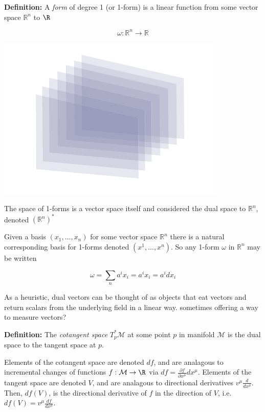 \documentclass{article}\usepackage[]{graphicx}\usepackage[]{color}
\newcommand{\Rn}{\mathbb{R}^n}
\newcommand{\M}{\mathcal{M}}
\begin{document}
\vspace{1cm}

\textbf{Definition:} A \textit{form} of degree 1 (or 1-form) is a linear function from some vector space $\Rn$ to $\R$

\vspace{-.18cm}

$$\omega:\mathbb{R}^n\rightarrow\mathbb{R}$$

\begin{center}
\includegraphics[scale=1]{1form.pdf}
\end{center}

The space of 1-forms is a vector space itself and considered the dual space to $\mathbb{R}^n$, denoted $(\mathbb{R}^n)^*$

Given a basis $(x_1,...,x_n)$ for some vector space $\Rn$ there is a natural corresponding basis for 1-forms denoted $(x^1,...,x^n)$. So any 1-form $\omega$ in $\Rn$ may be written 



$$
\omega=\sum_n a^i x_i=a^i x_i=a^idx_i
$$

As a heuristic, dual vectors can be thought of as objects that eat vectors and return scalars from the underlying field in a linear way. sometimes offering a way to measure vectors?

\begin{center}

\end{center}

\textbf{Definition:} The \textit{cotangent space} $T^*_p\M$ at some point $p$ in manifold $\M$ is the dual space to the tangent space at $p$. 




Elements of the cotangent space are denoted $df$, and are analagous to incremental changes of functions $f:\M\rightarrow\R$ via $df=\frac{\partial f}{\partial x^{\mu}}dx^{\mu}$. Elements of the tangent space are denoted $V$, and are analagous to directional derivatives $v^{\mu}\frac{d}{dx^{\mu}}$. Then, $df(V)$, is the directional derivative of $f$ in the direction of $V$, i.e. $df(V)=v^{\mu}\frac{df}{dx^{\mu}}$.
\end{document}
